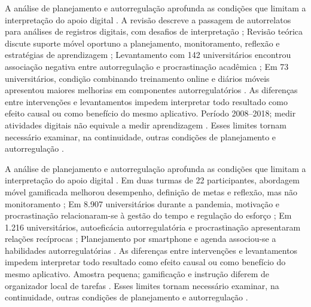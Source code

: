 A análise de planejamento e autorregulação aprofunda as condições que limitam a interpretação do apoio digital \citep[p. 4, 15–16]{education_araka2020} \citep{education_baars2022} \citep{education_brahma2023} \citep{education_broadbent2020}. A revisão descreve a passagem de autorrelatos para análises de registros digitais, com desafios de interpretação \citep[p. 4, 15–16]{education_araka2020}; Revisão teórica discute suporte móvel oportuno a planejamento, monitoramento, reflexão e estratégias de aprendizagem \citep{education_baars2022}; Levantamento com 142 universitários encontrou associação negativa entre autorregulação e procrastinação acadêmica \citep{education_brahma2023}; Em 73 universitários, condição combinando treinamento online e diários móveis apresentou maiores melhorias em componentes autorregulatórios \citep{education_broadbent2020}. As diferenças entre intervenções e levantamentos impedem interpretar todo resultado como efeito causal ou como benefício do mesmo aplicativo. Período 2008–2018; medir atividades digitais não equivale a medir aprendizagem \citep[p. 4, 15–16]{education_araka2020} \citep{education_baars2022} \citep{education_brahma2023} \citep{education_broadbent2020}. Esses limites tornam necessário examinar, na continuidade, outras condições de planejamento e autorregulação \citep[p. 4, 15–16]{education_araka2020} \citep{education_baars2022} \citep{education_brahma2023} \citep{education_broadbent2020}.

A análise de planejamento e autorregulação aprofunda as condições que limitam a interpretação do apoio digital \citep{education_chen2024} \citep{education_forstervold2022} \citep{education_han2023} \citep{education_hartley2022}. Em duas turmas de 22 participantes, abordagem móvel gamificada melhorou desempenho, definição de metas e reflexão, mas não monitoramento \citep{education_chen2024}; Em 8.907 universitários durante a pandemia, motivação e procrastinação relacionaram-se à gestão do tempo e regulação do esforço \citep{education_forstervold2022}; Em 1.216 universitários, autoeficácia autorregulatória e procrastinação apresentaram relações recíprocas \citep{education_han2023}; Planejamento por smartphone e agenda associou-se a habilidades autorregulatórias \citep{education_hartley2022}. As diferenças entre intervenções e levantamentos impedem interpretar todo resultado como efeito causal ou como benefício do mesmo aplicativo. Amostra pequena; gamificação e instrução diferem de organizador local de tarefas \citep{education_chen2024} \citep{education_forstervold2022} \citep{education_han2023} \citep{education_hartley2022}. Esses limites tornam necessário examinar, na continuidade, outras condições de planejamento e autorregulação \citep{education_chen2024} \citep{education_forstervold2022} \citep{education_han2023} \citep{education_hartley2022}.

